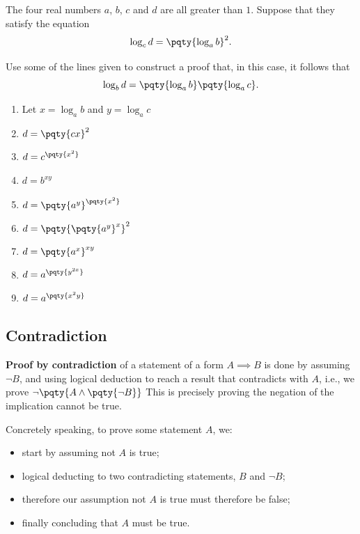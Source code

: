 \documentclass{article}
\begin{document}
\begin{example}[TMUA 2016 P2 Q7]
    The four real numbers \(a\), \(b\), \(c\) and \(d\) are all greater than \(1\). Suppose that they satisfy the equation
    \[
        \log_c d = \pqty{\log_a b}^2.
    \]

    Use some of the lines given to construct a proof that, in this case, it follows that
    \[
        \log_b d = \pqty{\log_a b} \pqty{\log_a c}.
    \]

    \begin{enumerate}
        \item Let \(x = \log_a b\) and \(y = \log_a c\) \vspace{1em}
        \item \(d = \pqty{c x}^2\)
        \item \(d = c^{\pqty{x^2}}\)
        \item \(d = b^{xy}\) \vspace{1em}
        \item \(d = \pqty{a^y}^{\pqty{x^2}}\)
        \item \(d = \pqty{\pqty{a^y}^x}^2\)
        \item \(d = \pqty{a^x}^{xy}\) \vspace{1em}
        \item \(d = a^{\pqty{y^{2x}}}\)
        \item \(d = a^{\pqty{x^2 y}}\)
    \end{enumerate}
\end{example}

\subsection{Contradiction}

\textbf{Proof by contradiction} of a statement of a form \(A \implies B\) is done by assuming \(\lnot B\), and using logical deduction to reach a result that contradicts with \(A\), i.e., we prove \(\lnot \pqty{A \land \pqty{\lnot B}}\) This is precisely proving the negation of the implication cannot be true.

Concretely speaking, to prove some statement \(A\), we:
\begin{itemize}
    \item start by assuming not \(A\) is true;
    \item logical deducting to two contradicting statements, \(B\) and \(\lnot B\);
    \item therefore our assumption not \(A\) is true must therefore be false;
    \item finally concluding that \(A\) must be true.
\end{itemize}
\end{document}
